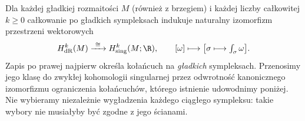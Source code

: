 \begin{twierdzenie}[de Rham]
\label{thm:de-rham}
Dla każdej gładkiej rozmaitości $M$ (również z brzegiem)
i każdej liczby całkowitej $k\geq0$
całkowanie po gładkich sympleksach indukuje naturalny
izomorfizm przestrzeni wektorowych
\begin{equation}\label{eq:de-rham-iso}
 H^k_{\mathrm{dR}}(M)\xrightarrow{\ \cong\ }
 H^k_{\mathrm{sing}}(M;\R),
 \qquad [\omega]\longmapsto
 \bigl[\sigma\longmapsto\textstyle\int_\sigma\omega\bigr].
\end{equation}
Zapis po prawej najpierw określa kołańcuch na
\emph{gładkich} sympleksach. Przenosimy jego klasę do
zwykłej kohomologii singularnej przez odwrotność
kanonicznego izomorfizmu ograniczenia kołańcuchów,
którego istnienie udowodnimy poniżej. Nie wybieramy
niezależnie wygładzenia każdego ciągłego sympleksu:
takie wybory nie musiałyby być zgodne z jego ścianami.
\end{twierdzenie}

